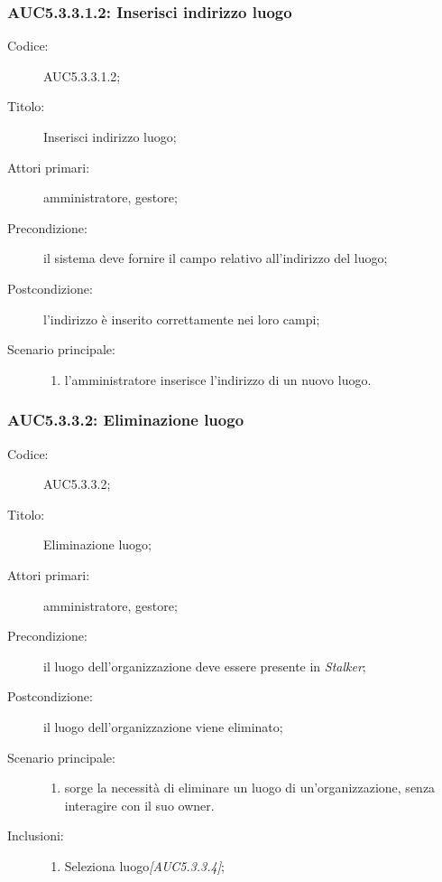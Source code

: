 \subsubsection{AUC5.3.3.1.2: Inserisci indirizzo luogo}%
\label{subs:AUC5.3.3.1.2}
\begin{description}
  \item[Codice:] AUC5.3.3.1.2;
  \item[Titolo:] Inserisci indirizzo luogo;
  \item[Attori primari:] amministratore, gestore;
  \item[Precondizione:] il sistema deve fornire il campo relativo all'indirizzo del luogo;
  \item[Postcondizione:] l'indirizzo è inserito correttamente nei loro campi;
  \item[Scenario principale:]
  \begin{enumerate}
    \item l'amministratore inserisce l'indirizzo di un nuovo luogo.
  \end{enumerate}
\end{description}

\subsubsection{AUC5.3.3.2: Eliminazione luogo}%
\label{subs:AUC5.3.3.2}
\begin{description}
  \item[Codice:] AUC5.3.3.2;
  \item[Titolo:] Eliminazione luogo;
  \item[Attori primari:] amministratore, gestore;
  \item[Precondizione:] il luogo dell'organizzazione deve essere presente in \emph{Stalker};
  \item[Postcondizione:] il luogo dell'organizzazione viene eliminato;
  \item[Scenario principale:]
  \begin{enumerate}
    \item sorge la necessità di eliminare un luogo di un'organizzazione, senza interagire con il suo owner.
  \end{enumerate}
  \item[Inclusioni:]
  \begin{enumerate}
    \item Seleziona luogo\emph{[AUC5.3.3.4]};
  \end{enumerate}
\end{description}

